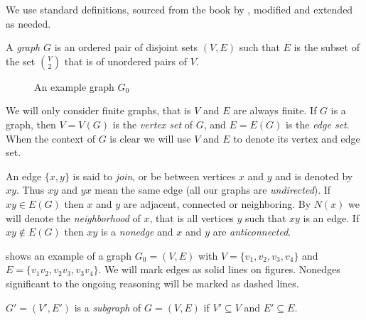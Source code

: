 
We use standard definitions, sourced from the book by \citeauthor{BB98} , modified and extended as needed.

\begin{defn}[graph]
  A \emph{graph} $G$ is an ordered pair of disjoint sets $(V, E)$ such that $E$ is the subset of the set $V \choose 2$ that is of unordered pairs of $V$.
\end{defn}

\begin{wrapfigure}{r}{0.4\textwidth}
  \centering{}
  \caption{An example graph $G_0$}
  \label{fig:examplePath}
\end{wrapfigure}

We will only consider finite graphs, that is $V$ and $E$ are always finite. If $G$ is a graph, then $V = V(G)$ is the \emph{vertex set} of $G$, and $E = E(G)$ is the \emph{edge set}. When the context of $G$ is clear we will use $V$ and $E$ to denote its vertex and edge set.

An edge $\{x, y\}$ is said to \emph{join}, or be between vertices $x$ and $y$ and is denoted by $xy$. Thus $xy$ and $yx$ mean the same edge (all our graphs are \emph{undirected}). If $xy \in E(G)$ then $x$ and $y$ are adjacent, connected or neighboring. By $N(x)$ we will denote the \emph{neighborhood} of $x$, that is all vertices $y$ such that $xy$ is an edge. If $xy \notin E(G)$ then $xy$ is a \emph{nonedge} and $x$ and $y$ are \emph{anticonnected}.

 shows an example of a graph $G_0 = (V, E)$ with $V = \{v_1, v_2, v_3, v_4\}$ and $E = \{v_1v_2, v_2v_3, v_3v_4\}$. We will mark edges as solid lines on figures. Nonedges significant to the ongoing reasoning will be marked as dashed lines.

\begin{defn}[subgraph]
  $G' = (V', E')$ is a \emph{subgraph} of $G = (V, E)$ if $V' \subseteq V$ and $E' \subseteq E$.
\end{defn}

